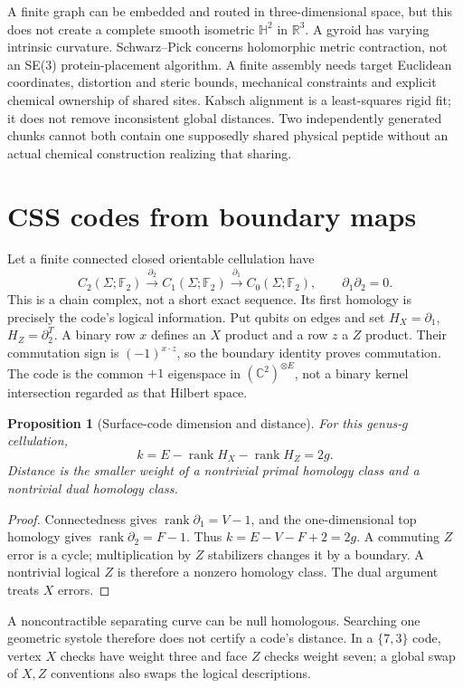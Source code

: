 \documentclass[11pt,oneside,openany]{book}
\newtheorem{proposition}[theorem]{Proposition}
\theoremstyle{definition}\newtheorem{definition}[theorem]{Definition}
\theoremstyle{remark}\newtheorem{remark}[theorem]{Remark}
\newcommand{\C}{\mathbb C}\newcommand{\Z}{\mathbb Z}\newcommand{\R}{\mathbb R}
\begin{document}
A finite graph can be embedded and routed in three-dimensional space,
but this does not create a complete smooth isometric $\mathbb H^2$ in
$\R^3$. A gyroid has varying intrinsic curvature. Schwarz--Pick concerns
holomorphic metric contraction, not an SE(3) protein-placement algorithm.
A finite assembly needs target Euclidean coordinates, distortion and
steric bounds, mechanical constraints and explicit chemical ownership of
shared sites. Kabsch alignment is a least-squares rigid fit; it does not
remove inconsistent global distances. Two independently generated chunks
cannot both contain one supposedly shared physical peptide without an
actual chemical construction realizing that sharing.

\section{CSS codes from boundary maps}
Let a finite connected closed orientable cellulation have
\[
 C_2(\Sigma;\mathbb F_2)\xrightarrow{\partial_2}
 C_1(\Sigma;\mathbb F_2)\xrightarrow{\partial_1}
 C_0(\Sigma;\mathbb F_2),\qquad\partial_1\partial_2=0.
\]
This is a chain complex, not a short exact sequence. Its first homology
is precisely the code's logical information. Put qubits on edges and set
$H_X=\partial_1$, $H_Z=\partial_2^T$. A binary row $x$ defines an
$X$ product and a row $z$ a $Z$ product. Their commutation sign is
$(-1)^{x\cdot z}$, so the boundary identity proves commutation.
The code is the common $+1$ eigenspace in $(\C^2)^{\otimes E}$, not a
binary kernel intersection regarded as that Hilbert space.

\begin{proposition}[Surface-code dimension and distance]
For this genus-$g$ cellulation,
\[
 k=E-\operatorname{rank}H_X-\operatorname{rank}H_Z=2g.
\]
Distance is the smaller weight of a nontrivial primal homology class and
a nontrivial dual homology class.
\end{proposition}
\begin{proof}
Connectedness gives $\operatorname{rank}\partial_1=V-1$, and the
one-dimensional top homology gives $\operatorname{rank}\partial_2=F-1$.
Thus $k=E-V-F+2=2g$. A commuting $Z$ error is a cycle; multiplication by
$Z$ stabilizers changes it by a boundary. A nontrivial logical $Z$ is
therefore a nonzero homology class. The dual argument treats $X$ errors.
\end{proof}
A noncontractible separating curve can be null homologous. Searching one
geometric systole therefore does not certify a code's distance. In a
$\{7,3\}$ code, vertex $X$ checks have weight three and face $Z$ checks
weight seven; a global swap of $X,Z$ conventions also swaps the logical
descriptions.
\end{document}
